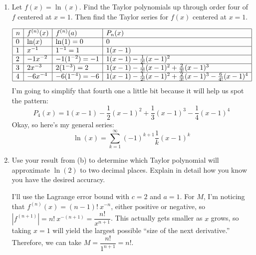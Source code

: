 \begin{enumerate}[leftmargin=0pt]
\begin{enumerate}
\begin{red}
    \end{red}
    \item Let $f(x) = \ln(x)$. Find the Taylor polynomials up through order four of $f$ centered at $x=1$. Then find the Taylor series for $f(x)$ centered at $x=1$.
    
    \begin{red}
    \[
    \begin{array}{|l|l|l|l|}
    \hline
    n & f^{(n)}(x) & f^{(n)}(a)      & P_n(x)                                             \\ \hline
    0 & \ln(x)     & \ln(1) = 0      & 0                                                  \\ \hline
    1 & x^{-1}     & 1^{-1} = 1      & 1(x-1)                                             \\ \hline
    2 & -1x^{-2}   & -1(1^{-2}) = -1 & 1(x-1) 
                                       - \frac{1}{2!}(x-1)^2  \\ \hline
    3 & 2x^{-3}    & 2(1^{-3}) = 2   & 1(x-1) 
                                       - \frac{1}{2!}(x-1)^2 
                                       + \frac{2}{3!}(x-1)^3 \\ \hline
    4 & -6x^{-4}   & -6(1^{-4}) = -6 & 1(x-1) 
                                       - \frac{1}{2!}(x-1)^2 
                                       + \frac{2}{3!}(x-1)^3 
                                       - \frac{6}{4!}(x-1)^4 \\ \hline
    \end{array}
    \]
    I'm going to simplify that fourth one a little bit because it will help us spot the pattern:
    \[P_4(x) = 1(x-1) 
               - \frac{1}{2}(x-1)^2 
               + \frac{1}{3}(x-1)^3 
               - \frac{1}{4}(x-1)^4
               \]
    Okay, so here's my general series:
    \[\ln(x) = \sum\limits_{k=1}^\infty (-1)^{k+1} \frac{1}{k} (x-1)^k\]
    \end{red}
    \item Use your result from (b) to determine which Taylor polynomial will approximate $\ln(2)$ to two decimal places. Explain in detail how you know you have the desired accuracy.
    
    \begin{red}
    I'll use the Lagrange error bound with $c=2$ and $a=1$. For $M$, I'm noticing that $f^{(n)}(x) = (n-1)!\ x^{-n}$, either positive or negative, so $|f^{(n+1)}| = n!\  x^{-(n+1)} = \dfrac{n!}{x^{n+1}}$. This actually gets smaller as $x$ grows, so taking $x=1$ will yield the largest possible ``size of the next derivative.'' Therefore, we can take $M = \dfrac{n!}{1^{n+1}} = n!$.
    

\end{red}
\end{enumerate}
\end{enumerate}
